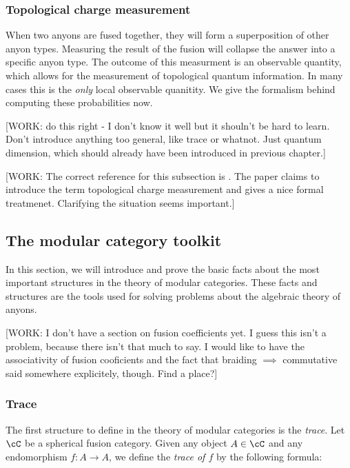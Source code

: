 \subsubsection{Topological charge measurement}

When two anyons are fused together, they will form a superposition of other anyon types. Measuring the result of the fusion will collapse the answer into a specific anyon type. The outcome of this measurment is an observable quantity, which allows for the measurement of topological quantum information. In many cases this is the \textit{only} local observable quanitity. We give the formalism behind computing these probabilities now.

[WORK: do this right - I don't know it well but it shouln't be hard to learn. Don't introduce anything too general, like trace or whatnot. Just quantum dimension, which should already have been introduced in previous chapter.]

[WORK: The correct reference for this subsection is \cite{bonderson2021measuring}. The paper \cite{cong2017universal} claims to introduce the term topological charge measurement and gives a nice formal treatmenet. Clarifying the situation seems important.]
 


\subsection{The modular category toolkit}

In this section, we will introduce and prove the basic facts about the most important structures in the theory of modular categories. These facts and structures are the tools used for solving problems about the algebraic theory of anyons. 

[WORK: I don't have a section on fusion coefficients yet. I guess this isn't a problem, because there isn't that much to say. I would like to have the associativity of fusion cooficients and the fact that braiding $\implies$ commutative said somewhere explicitely, though. Find a place?]

\subsubsection{Trace}

The first structure to define in the theory of modular categories is the \textit{trace}. Let $\cC$ be a spherical fusion category. Given any object $A\in \cC$ and any endomorphism $f:A\to A$, we define the \textit{trace of $f$} by the following formula:

